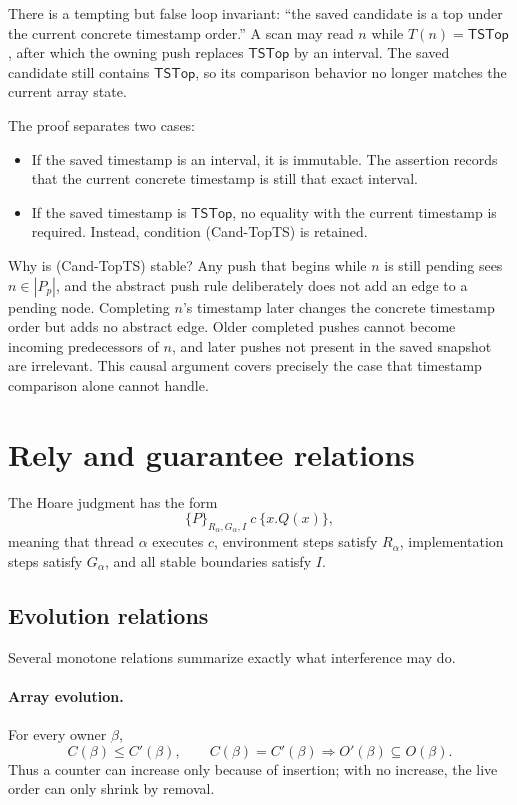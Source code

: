 \documentclass[11pt]{article}
\theoremstyle{definition}
\theoremstyle{remark}
\newcommand{\topts}{\mathsf{TSTop}}
\begin{document}
There is a tempting but false loop invariant: ``the saved candidate is a top
under the current concrete timestamp order.''  A scan may read \(n\) while
\(T(n)=\topts\), after which the owning push replaces \(\topts\) by an interval.
The saved candidate still contains \(\topts\), so its comparison behavior no
longer matches the current array state.

The proof separates two cases:
\begin{itemize}
\item If the saved timestamp is an interval, it is immutable.  The assertion
  records that the current concrete timestamp is still that exact interval.
\item If the saved timestamp is \(\topts\), no equality with the current
  timestamp is required.  Instead, condition \textup{(Cand-TopTS)} is retained.
\end{itemize}
Why is \textup{(Cand-TopTS)} stable?  Any push that begins while \(n\) is still
pending sees \(n\in|P_p|\), and the abstract push rule deliberately does not
add an edge to a pending node.  Completing \(n\)'s timestamp later changes the
concrete timestamp order but adds no abstract edge.  Older completed pushes
cannot become incoming predecessors of \(n\), and later pushes not present in
the saved snapshot are irrelevant.  This causal argument covers precisely the
case that timestamp comparison alone cannot handle.

\section{Rely and guarantee relations}

The Hoare judgment has the form
\[
  \{P\}_{R_\alpha,G_\alpha,I}\ c\ \{x.Q(x)\},
\]
meaning that thread \(\alpha\) executes \(c\), environment steps satisfy
\(R_\alpha\), implementation steps satisfy \(G_\alpha\), and all stable
boundaries satisfy \(I\).

\subsection{Evolution relations}

Several monotone relations summarize exactly what interference may do.

\paragraph{Array evolution.}
For every owner \(\beta\),
\[
C(\beta)\le C'(\beta),
\qquad
C(\beta)=C'(\beta)\Longrightarrow O'(\beta)\subseteq O(\beta).
\tag{Arr-Evol}
\]
Thus a counter can increase only because of insertion; with no increase, the
live order can only shrink by removal.
\end{document}
